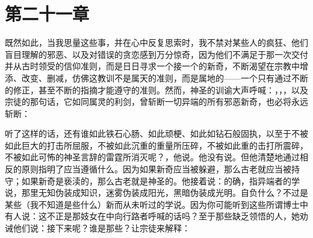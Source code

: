 
\section{第二十一章}

\par

既然如此，当我思量这些事，并在心中反复思索时，我不禁对某些人的疯狂、他们盲目理解的邪恶、以及对错误的贪恋感到万分惊奇，因为他们不满足于那一次交付并从古时领受的信仰准则，而是日日寻求一个接一个的新奇，不断渴望在宗教中增添、改变、删减，仿佛这教训不是属天的准则，而是属地的——一个只有通过不断的修正，甚至不断的指摘才能遵守的准则。然而，神圣的训谕大声呼喊：，，，以及宗徒的那句话，它如同属灵的利剑，曾斩断一切异端的所有邪恶新奇，也必将永远斩断：\par

听了这样的话，还有谁如此铁石心肠、如此顽梗、如此如钻石般固执，以至于不被如此巨大的打击所屈服，不被如此沉重的重量所压碎，不被如此重的击打所震碎，不被如此可怖的神圣言辞的雷霆所消灭呢？，他说。他没有说。但他清楚地通过相反的原则指明了应当遵循什么。因为如果新奇应当被躲避，那么古老就应当被持守；如果新奇是亵渎的，那么古老就是神圣的。他接着说：的确，指异端者的学说，那里无知伪装成知识，迷雾伪装成阳光，黑暗伪装成光明。自负什么？不过是某些（我不知道是些什么）新而从未听过的学说。因为你可能听到这些所谓博士中有人说：这不正是那妓女在中向行路者呼喊的话吗？至于那些缺乏领悟的人，她劝诫他们说：接下来呢？谁是那些？让宗徒来解释：\par

